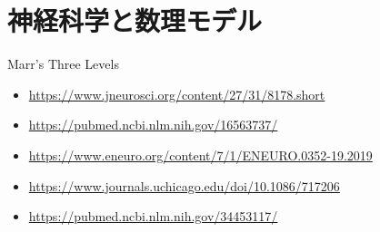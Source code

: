 \section{神経科学と数理モデル
}
Marr's Three Levels



\begin{itemize}
\item \url{https://www.jneurosci.org/content/27/31/8178.short}

\item \url{https://pubmed.ncbi.nlm.nih.gov/16563737/}

\item \url{https://www.eneuro.org/content/7/1/ENEURO.0352-19.2019}

\item \url{https://www.journals.uchicago.edu/doi/10.1086/717206}

\item \url{https://pubmed.ncbi.nlm.nih.gov/34453117/}
\end{itemize}
